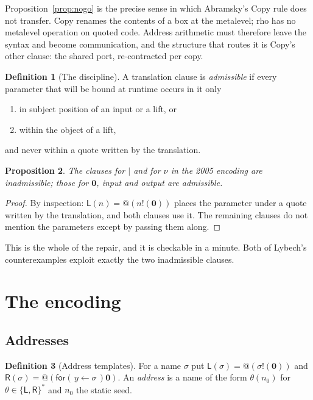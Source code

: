 \documentclass[11pt]{article}
\makeatletter
\theoremstyle{definition}
\newtheorem{definition}{Definition}[section]
\theoremstyle{plain}
\newtheorem{proposition}[definition]{Proposition}
\theoremstyle{remark}
\newcommand{\quo}[1]{@#1}
\newcommand{\inp}[3]{\mathsf{for}(\,#1 \leftarrow #2\,)#3}
\newcommand{\out}[2]{#1!(#2)}
\newcommand{\nil}{\mathbf{0}}
\newcommand{\Lft}{\mathsf{L}}
\newcommand{\Rgt}{\mathsf{R}}
\makeatother
\begin{document}
Proposition~\ref{prop:nogo} is the precise sense in which Abramsky's Copy
rule does not transfer. Copy renames the contents of a box at the
metalevel; rho has no metalevel operation on quoted code. Address
arithmetic must therefore leave the syntax and become communication, and
the structure that routes it is Copy's other clause: the shared port,
re-contracted per copy.

\begin{definition}[The discipline]\label{def:discipline}
A translation clause is \emph{admissible} if every parameter that will be
bound at runtime occurs in it only
\begin{enumerate}[label=(\alph*),leftmargin=2.2em,nosep]
\item in subject position of an input or a lift, or
\item within the object of a lift,
\end{enumerate}
and never within a quote written by the translation.
\end{definition}

\begin{proposition}
The clauses for $\mid$ and for $\nu$ in the 2005 encoding are
inadmissible; those for $\nil$, input and output are admissible.
\end{proposition}

\begin{proof}
By inspection: $\Lft(n) = \quo{(\out{n}{\nil})}$ places the parameter
under a quote written by the translation, and both clauses use it. The
remaining clauses do not mention the parameters except by passing them
along.
\end{proof}

This is the whole of the repair, and it is checkable in a minute. Both of
Lybech's counterexamples exploit exactly the two inadmissible clauses.

\section{The encoding}\label{sec:encoding}

\subsection{Addresses}

\begin{definition}[Address templates]
For a name $\sigma$ put
$\Lft(\sigma) = \quo{(\out{\sigma}{\nil})}$ and
$\Rgt(\sigma) = \quo{(\inp{y}{\sigma}{\nil})}$.
An \emph{address} is a name of the form $\theta(n_0)$ for
$\theta \in \{\Lft,\Rgt\}^*$ and $n_0$ the static seed.
\end{definition}
\end{document}
